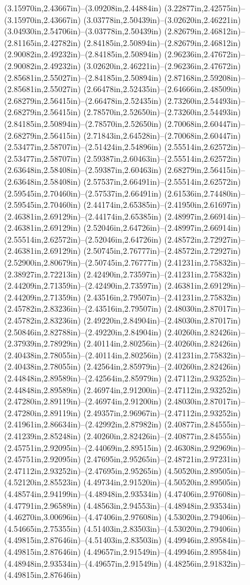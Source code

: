 (3.15970in,2.43667in)--(3.09208in,2.44884in) (3.22877in,2.42575in)--(3.15970in,2.43667in) (3.03778in,2.50439in)--(3.02620in,2.46221in) (3.04930in,2.54706in)--(3.03778in,2.50439in) (2.82679in,2.46812in)--(2.81165in,2.42782in) (2.84185in,2.50894in)--(2.82679in,2.46812in) (2.90082in,2.49232in)--(2.84185in,2.50894in) (2.96236in,2.47672in)--(2.90082in,2.49232in) (3.02620in,2.46221in)--(2.96236in,2.47672in) (2.85681in,2.55027in)--(2.84185in,2.50894in) (2.87168in,2.59208in)--(2.85681in,2.55027in) (2.66478in,2.52435in)--(2.64666in,2.48509in) (2.68279in,2.56415in)--(2.66478in,2.52435in) (2.73260in,2.54493in)--(2.68279in,2.56415in) (2.78570in,2.52650in)--(2.73260in,2.54493in) (2.84185in,2.50894in)--(2.78570in,2.52650in) (2.70068in,2.60447in)--(2.68279in,2.56415in) (2.71843in,2.64528in)--(2.70068in,2.60447in) (2.53477in,2.58707in)--(2.51424in,2.54896in) (2.55514in,2.62572in)--(2.53477in,2.58707in) (2.59387in,2.60463in)--(2.55514in,2.62572in) (2.63648in,2.58408in)--(2.59387in,2.60463in) (2.68279in,2.56415in)--(2.63648in,2.58408in) (2.57537in,2.66491in)--(2.55514in,2.62572in) (2.59545in,2.70460in)--(2.57537in,2.66491in) (2.61536in,2.74480in)--(2.59545in,2.70460in) (2.44174in,2.65385in)--(2.41950in,2.61697in) (2.46381in,2.69129in)--(2.44174in,2.65385in) (2.48997in,2.66914in)--(2.46381in,2.69129in) (2.52046in,2.64726in)--(2.48997in,2.66914in) (2.55514in,2.62572in)--(2.52046in,2.64726in) (2.48572in,2.72927in)--(2.46381in,2.69129in) (2.50745in,2.76777in)--(2.48572in,2.72927in) (2.52900in,2.80679in)--(2.50745in,2.76777in) (2.41231in,2.75832in)--(2.38927in,2.72213in) (2.42490in,2.73597in)--(2.41231in,2.75832in) (2.44209in,2.71359in)--(2.42490in,2.73597in) (2.46381in,2.69129in)--(2.44209in,2.71359in) (2.43516in,2.79507in)--(2.41231in,2.75832in) (2.45782in,2.83236in)--(2.43516in,2.79507in) (2.48030in,2.87017in)--(2.45782in,2.83236in) (2.49220in,2.84904in)--(2.48030in,2.87017in) (2.50846in,2.82788in)--(2.49220in,2.84904in) (2.40260in,2.82426in)--(2.37939in,2.78929in) (2.40114in,2.80256in)--(2.40260in,2.82426in) (2.40438in,2.78055in)--(2.40114in,2.80256in) (2.41231in,2.75832in)--(2.40438in,2.78055in) (2.42564in,2.85979in)--(2.40260in,2.82426in) (2.44848in,2.89589in)--(2.42564in,2.85979in) (2.47112in,2.93252in)--(2.44848in,2.89589in) (2.46974in,2.91200in)--(2.47112in,2.93252in) (2.47280in,2.89119in)--(2.46974in,2.91200in) (2.48030in,2.87017in)--(2.47280in,2.89119in) (2.49357in,2.96967in)--(2.47112in,2.93252in) (2.41961in,2.86634in)--(2.42992in,2.87982in) (2.40877in,2.84555in)--(2.41239in,2.85248in) (2.40260in,2.82426in)--(2.40877in,2.84555in) (2.45751in,2.92095in)--(2.44069in,2.89515in) (2.46308in,2.92969in)--(2.45751in,2.92095in) (2.47695in,2.95265in)--(2.48721in,2.97231in) (2.47112in,2.93252in)--(2.47695in,2.95265in) (4.50520in,2.89505in)--(4.52120in,2.85523in) (4.49734in,2.91520in)--(4.50520in,2.89505in) (4.48574in,2.94199in)--(4.48948in,2.93534in) (4.47406in,2.97608in)--(4.47791in,2.96589in) (4.48563in,2.94553in)--(4.48948in,2.93534in) (4.46270in,3.00696in)--(4.47406in,2.97608in) (4.53020in,2.79406in)--(4.54665in,2.75355in) (4.51403in,2.83503in)--(4.53020in,2.79406in) (4.49815in,2.87646in)--(4.51403in,2.83503in) (4.49946in,2.89584in)--(4.49815in,2.87646in) (4.49657in,2.91549in)--(4.49946in,2.89584in) (4.48948in,2.93534in)--(4.49657in,2.91549in) (4.48256in,2.91832in)--(4.49815in,2.87646in) 
